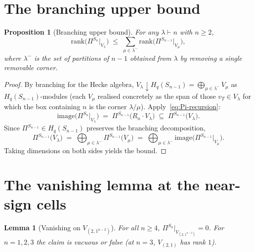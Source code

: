 \documentclass[11pt]{article}
\newtheorem{lemma}[theorem]{Lemma}
\newtheorem{proposition}[theorem]{Proposition}
\theoremstyle{definition}
\newcommand{\Pis}[1]{\Pi^{S_{#1}}}
\newcommand{\Hq}[1]{H_q(S_{#1})}
\begin{document}
\section{The branching upper bound}\label{sec:branching}

\begin{proposition}[Branching upper bound]\label{prop:branching}
For any $\lambda \vdash n$ with $n \ge 2$,
\[
\mathrm{rank}\bigl(\Pis{n}\big|_{V_\lambda}\bigr)
\;\le\; \sum_{\mu \in \lambda^-} \mathrm{rank}\bigl(\Pis{n-1}\big|_{V_\mu}\bigr),
\]
where $\lambda^-$ is the set of partitions of $n-1$ obtained from
$\lambda$ by removing a single removable corner.
\end{proposition}

\begin{proof}
By branching for the Hecke algebra,
$V_\lambda{\downarrow}\Hq{n-1} = \bigoplus_{\mu \in \lambda^-} V_\mu$
as $\Hq{n-1}$-modules (each $V_\mu$ realised concretely as the span of
those $v_T \in V_\lambda$ for which the box containing $n$ is the corner
$\lambda/\mu$). Apply~\eqref{eq:Pi-recursion}:
\[
\mathrm{image}\bigl(\Pis{n}\big|_{V_\lambda}\bigr)
\;=\; \Pis{n-1}\bigl(R_n\cdot V_\lambda\bigr)
\;\subseteq\; \Pis{n-1}\bigl(V_\lambda\bigr).
\]
Since $\Pis{n-1} \in \Hq{n-1}$ preserves the branching decomposition,
\[
\Pis{n-1}\bigl(V_\lambda\bigr)
\;=\; \bigoplus_{\mu \in \lambda^-} \Pis{n-1}\bigl(V_\mu\bigr)
\;=\; \bigoplus_{\mu \in \lambda^-} \mathrm{image}\bigl(\Pis{n-1}\big|_{V_\mu}\bigr).
\]
Taking dimensions on both sides yields the bound.
\end{proof}

\section{The vanishing lemma at the near-sign cells}\label{sec:vanishing}

\begin{lemma}[Vanishing on $V_{(2,1^{n-2})}$]\label{lem:vanishing}
For all $n \ge 4$, $\Pis{n}\big|_{V_{(2,1^{n-2})}} = 0$.
For $n = 1, 2, 3$ the claim is vacuous or false (at $n=3$, $V_{(2,1)}$
has rank $1$).
\end{lemma}
\end{document}
